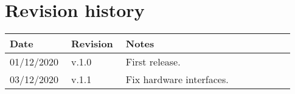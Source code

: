 \chapter*{Revision history}

\begin{center}
	\begin{tabular}{@{}p{0.18\linewidth} p{0.18\linewidth} p{0.57\linewidth}@{}}
		\toprule
		\textbf{Date} & \textbf{Revision} & \textbf{Notes}\\
		\midrule
		01/12/2020 & v.1.0 & First release.\\
		03/12/2020 & v.1.1 & Fix hardware interfaces.\\
		\bottomrule
	\end{tabular}
\end{center}